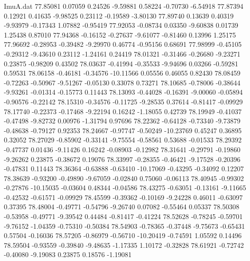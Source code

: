 \begin{filecontents}{ImuA.dat}
  77.85081    0.07059    0.24526   -9.59881    0.58224   -0.70730   -6.54918
  77.87394    0.12921    0.41635   -9.98525    0.23112   -0.19589   -3.80130
  77.89740    0.13639    0.40319   -9.93979   -0.17343    1.07882   -0.95419
  77.92053   -0.08734    0.03350   -9.60838    0.01739    1.25438    0.87010
  77.94368   -0.16152   -0.27637   -9.61077   -0.81460    0.13996    1.25175
  77.96692   -0.28953   -0.39482   -9.29970    0.46774   -0.95156    0.68691
  77.98999   -0.45105   -0.29312   -9.43610    0.23112   -1.24161    0.24419
  78.01321   -0.31466   -0.26680   -9.23271    0.23875   -0.98209    0.43502
  78.03637   -0.41994   -0.35533   -9.94696    0.03266   -0.59281    0.59531
  78.06158   -0.46181   -0.34576  -10.11566    0.05556    0.46055    0.82430
  78.08459   -0.72263   -0.50967   -9.51267   -0.05130    0.33078    0.73271
  78.10685   -0.78006   -0.38644   -9.93261   -0.01314   -0.15773    0.11443
  78.13093   -0.44028   -0.16391   -9.00060   -0.05894   -0.90576   -0.22142
  78.15310   -0.34576   -0.11725   -9.28535    0.37614   -0.81417   -0.09929
  78.17740   -0.22373   -0.17468   -9.22194    0.16242   -1.18055    0.42739
  78.19949   -0.41037   -0.47498   -9.82732    0.00976   -1.31794    0.97696
  78.22362   -0.64128   -0.73340   -9.73879   -0.48638   -0.79127    0.92353
  78.24667   -0.97747   -0.50249  -10.23769    0.45247    0.36895    0.32052
  78.27029   -0.85902   -0.33141   -9.75554   -0.58561    0.53688   -0.01533
  78.29392   -0.47737    0.01436   -9.11426    0.16242   -0.08903   -0.12982
  78.31641   -0.29791   -0.19860   -9.26262    0.23875   -0.38672    0.19076
  78.33997   -0.28355   -0.46421   -9.17528   -0.20396   -0.47831    0.11443
  78.36364   -0.63888   -0.63410  -10.17069   -0.43295   -0.34092    0.12207
  78.38639   -0.93200   -0.49890   -9.67059   -0.02840    0.75060   -0.06113
  78.40945   -0.99302   -0.27876  -10.15035   -0.03604    0.48344   -0.04586
  78.43275   -0.63051   -0.13161   -9.11665   -0.42532   -0.61571   -0.09929
  78.45599   -0.39362   -0.10169   -9.24228    0.46011   -0.63097    0.37395
  78.48004   -0.49771   -0.54796   -9.26740    0.07082   -0.55464    0.05337
  78.50308   -0.53958   -0.49771   -9.39542    0.44484   -0.81417   -0.41224
  78.52628   -0.78245   -0.59701   -9.76152   -1.04359   -0.75310   -0.50384
  78.54903   -0.78365   -0.37448   -9.75673   -0.65431    0.57504   -0.16036
  78.57205   -0.86979   -0.56710  -10.20419   -0.74591    1.05592    0.14496
  78.59504   -0.93559   -0.39840   -9.48635   -1.17335    1.10172   -0.32828
  78.61921   -0.72742   -0.40080   -9.19083    0.23875    0.18576   -1.19081

\end{filecontents}
